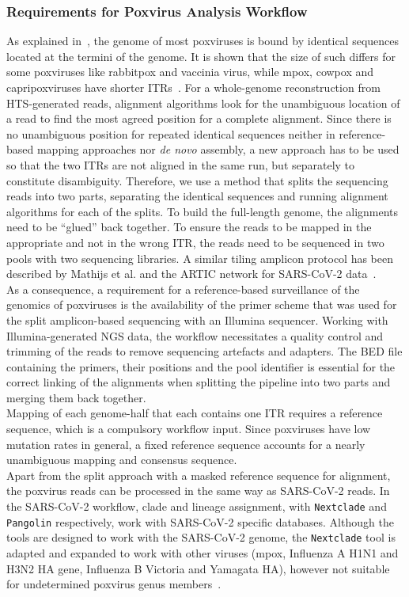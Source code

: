 \subsubsection{Requirements for Poxvirus Analysis Workflow}
As explained in~, the genome of most poxviruses is bound by identical sequences located at the termini of the genome. It is shown that the size of such differs for some poxviruses like rabbitpox and vaccinia virus, while mpox, cowpox and capripoxviruses have shorter \acp{ITR}~\cite{wittek1978inverted}. For a whole-genome reconstruction from \ac{HTS}-generated reads, alignment algorithms look for the unambiguous location of a read to find the most agreed position for a complete alignment. Since there is no unambiguous position for repeated identical sequences neither in reference-based mapping approaches nor \textit{de novo} assembly, a new approach has to be used so that the two \acp{ITR} are not aligned in the same run, but separately to constitute disambiguity. Therefore, we use a method that splits the sequencing reads into two parts, separating the identical sequences and running alignment algorithms for each of the splits. To build the full-length genome, the alignments need to be ``glued'' back together. To ensure the reads to be mapped in the appropriate and not in the wrong \ac{ITR}, the reads need to be sequenced in two pools with two sequencing libraries. A similar tiling amplicon protocol has been described by Mathijs et al. and the ARTIC network for \ac{SARS-CoV-2} data~\cite{tyson2020improvements, mathijs2022robust}. \\
As a consequence, a requirement for a reference-based surveillance of the genomics of poxviruses is the availability of the primer scheme that was used for the split amplicon-based sequencing with an Illumina sequencer. Working with Illumina-generated NGS data, the workflow necessitates a quality control and trimming of the reads to remove sequencing artefacts and adapters. The \ac{BED} file containing the primers, their positions and the pool identifier is essential for the correct linking of the alignments when splitting the pipeline into two parts and merging them back together. \\
Mapping of each genome-half that each contains one \ac{ITR} requires a reference sequence, which is a compulsory workflow input. Since poxviruses have low mutation rates in general, a fixed reference sequence accounts for a nearly unambiguous mapping and consensus sequence. \\
Apart from the split approach with a masked reference sequence for alignment, the poxvirus reads can be processed in the same way as \ac{SARS-CoV-2} reads. In the \ac{SARS-CoV-2} workflow, clade and lineage assignment, with \texttt{Nextclade} and \texttt{Pangolin} respectively, work with \ac{SARS-CoV-2} specific databases. Although the tools are designed to work with the \ac{SARS-CoV-2} genome, the \texttt{Nextclade} tool is adapted and expanded to work with other viruses (mpox, Influenza A H1N1 and H3N2 HA gene, Influenza B Victoria and Yamagata HA), however not suitable for undetermined poxvirus genus members~\cite{aksamentov2021nextclade}.

